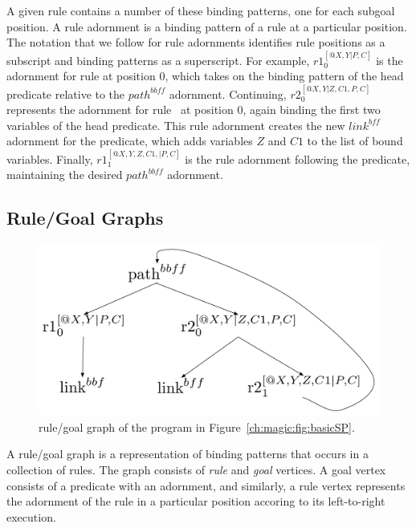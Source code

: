 A given rule contains a number of these binding patterns, one for each subgoal
position.  A rule adornment is a binding pattern of a rule at a particular
position.  The notation that we follow for rule adornments identifies rule
positions as a subscript and binding patterns as a superscript.  For example,
$r1_0^{[@X,Y|P,C]}$ is the adornment for rule  at position $0$, which
takes on the binding pattern of the head predicate relative to the
$path^{bbff}$ adornment.  Continuing, $r2_0^{[@X,Y|Z,C1,P,C]}$ represents the
adornment for rule~ at position $0$, again binding the first two
variables of the head predicate.  This rule adornment creates the new
$link^{bff}$ adornment for the  predicate, which adds variables $Z$
and $C1$ to the list of bound variables.  Finally, $r1_1^{[@X,Y,Z,C1,|P,C]}$ is
the rule adornment following the  predicate, maintaining the desired
$path^{bbff}$ adornment.

\subsection{Rule/Goal Graphs}

\begin{figure}[!t]
\begin{center}
\includegraphics[scale=0.5]{figures/RuleGoalGraph}
\caption{rule/goal graph of the program in Figure~\ref{ch:magic:fig:basicSP}.}
\label{ch:evita:fig:rggraph}
\end{center}
\end{figure}

A rule/goal graph is a representation of binding patterns that occurs in a
collection of rules.  The graph consists of \emph{rule} and \emph{goal}
vertices.  A goal vertex consists of a predicate with an adornment, and
similarly, a rule vertex represents the adornment of the rule in a particular
position accoring to its left-to-right execution.

